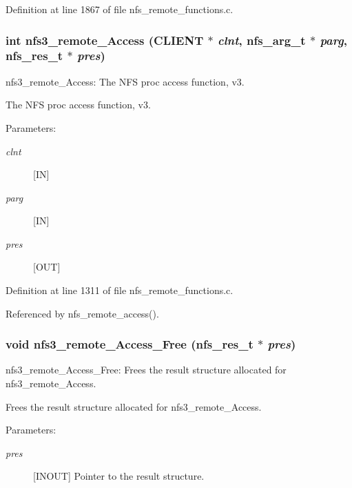 Definition at line 1867 of file nfs\_\-remote\_\-functions.c.
\subsubsection{\setlength{\rightskip}{0pt plus 5cm}int nfs3\_\-remote\_\-Access (CLIENT $\ast$ {\em clnt}, nfs\_\-arg\_\-t $\ast$ {\em parg}, nfs\_\-res\_\-t $\ast$ {\em pres})}\label{group__NFSprocs_ga34}


nfs3\_\-remote\_\-Access: The NFS proc access function, v3.

The NFS proc access function, v3.

\begin{Desc}
\item[Parameters:]
\begin{description}
\item[{\em clnt}][IN] \item[{\em parg}][IN] \item[{\em pres}][OUT] \end{description}
\end{Desc}


Definition at line 1311 of file nfs\_\-remote\_\-functions.c.

Referenced by nfs\_\-remote\_\-access().
\subsubsection{\setlength{\rightskip}{0pt plus 5cm}void nfs3\_\-remote\_\-Access\_\-Free (nfs\_\-res\_\-t $\ast$ {\em pres})}\label{group__NFSprocs_ga76}


nfs3\_\-remote\_\-Access\_\-Free: Frees the result structure allocated for nfs3\_\-remote\_\-Access.

Frees the result structure allocated for nfs3\_\-remote\_\-Access.

\begin{Desc}
\item[Parameters:]
\begin{description}
\item[{\em pres}][INOUT] Pointer to the result structure. \end{description}
\end{Desc}


